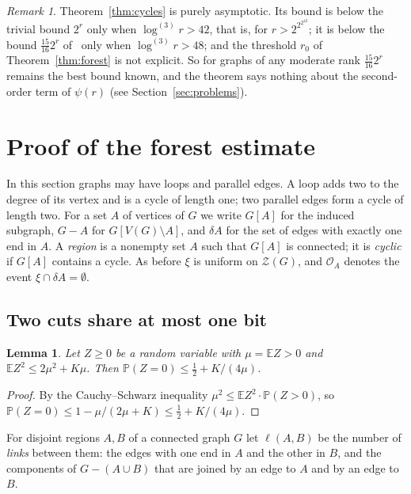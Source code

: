 \documentclass[11pt]{article}
\newtheorem{lemma}[theorem]{Lemma}
\theoremstyle{definition}
\theoremstyle{remark}
\newtheorem{remark}[theorem]{Remark}
\newcommand{\Z}{\mathcal{Z}}
\newcommand{\PP}{\mathbb{P}}
\newcommand{\EE}{\mathbb{E}}
\newcommand{\lgk}[1]{\log^{(#1)}}
\newcommand{\sm}{\setminus}
\newcommand{\half}{\tfrac12}
\newcommand{\cO}{\mathcal{O}}
\begin{document}
\begin{remark}\label{rem:asymptotic}
Theorem~\ref{thm:cycles} is purely asymptotic. Its bound is below the trivial bound $2^{r}$ only
when $\lgk3r>42$, that is, for $r>2^{2^{2^{42}}}$; it is below the bound $\frac{15}{16}2^{r}$
of~\cite{AT} only when $\lgk3r>48$; and the threshold $r_0$ of Theorem~\ref{thm:forest} is not
explicit. So for graphs of any moderate rank $\frac{15}{16}2^{r}$ remains the best bound known, and
the theorem says nothing about the second-order term of $\psi(r)$ (see
Section~\ref{sec:problems}).
\end{remark}


\section{Proof of the forest estimate}\label{sec:forest}

In this section graphs may have loops and parallel edges. A loop adds two to the degree of its vertex
and is a cycle of length one; two parallel edges form a cycle of length two. For a set $A$ of
vertices of $G$ we write $G[A]$ for the induced subgraph, $G-A$ for $G[V(G)\sm A]$, and $\delta A$
for the set of edges with exactly one end in $A$. A \emph{region} is a nonempty set $A$ such that
$G[A]$ is connected; it is \emph{cyclic} if $G[A]$ contains a cycle. As before $\xi$ is uniform on
$\Z(G)$, and $\cO_A$ denotes the event $\xi\cap\delta A=\emptyset$.

\subsection{Two cuts share at most one bit}

\begin{lemma}\label{lem:second}
Let $Z\ge0$ be a random variable with $\mu=\EE Z>0$ and $\EE Z^{2}\le2\mu^{2}+K\mu$. Then
$\PP(Z=0)\le\half+K/(4\mu)$.
\end{lemma}

\begin{proof}
By the Cauchy--Schwarz inequality $\mu^{2}\le\EE Z^{2}\cdot\PP(Z>0)$, so
$\PP(Z=0)\le1-\mu/(2\mu+K)\le\half+K/(4\mu)$.
\end{proof}

For disjoint regions $A,B$ of a connected graph $G$ let $\ell(A,B)$ be the number of \emph{links}
between them: the edges with one end in $A$ and the other in $B$, and the components of
$G-(A\cup B)$ that are joined by an edge to $A$ and by an edge to $B$.
\end{document}
